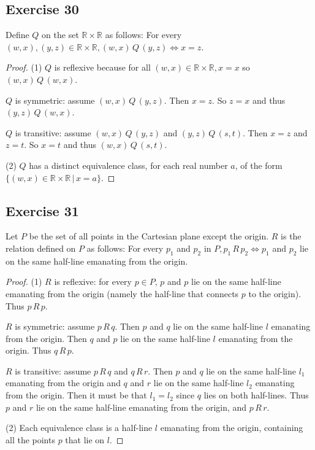 \documentclass[14pt]{extarticle}
\newcommand{\R}{\mathbb{R}}
\begin{document}
\subsection{Exercise 30}
Define $Q$ on the set \(\R \times \R\) as follows: For every \((w, x), (y, z) \in \R \times \R, (w, x) \,Q \, 
(y, z) \iff x = z\).

\begin{proof}
(1) $Q$ is reflexive because for all \((w, x) \in \R \times \R, x = x\) so \((w, x) \,Q\, (w, x)\).

$Q$ is symmetric: assume \((w, x) \,Q\, (y,z)\). Then \(x = z\). So \(z = x\) and thus \((y,z) \,Q\, (w, x)\).

$Q$ is transitive: assume \((w, x) \,Q\, (y,z)\) and \((y,z) \,Q\, (s,t)\). Then \(x = z\) and \(z = t\). So 
\(x = t\) and thus \((w,x) \,Q\, (s,t)\).

(2) $Q$ has a distinct equivalence class, for each real number $a$, of the form \(\{(w,x) \in \R \times \R \,|\,
x = a\}\).
\end{proof}

\subsection{Exercise 31}
Let $P$ be the set of all points in the Cartesian plane except the origin. $R$ is the relation defined on $P$ as 
follows: For every \(p_1\) and \(p_2\) in \(P, p_1 \,R\, p_2 \iff p_1\) and \(p_2\) lie on the same half-line 
emanating from the origin.

\begin{proof}
(1) $R$ is reflexive: for every \(p \in P\), $p$ and $p$ lie on the same half-line emanating from the origin (namely
the half-line that connects $p$ to the origin). Thus \(p \,R\, p\).

$R$ is symmetric: assume \(p\,R\,q\). Then $p$ and $q$ lie on the same half-line $l$ emanating from the origin. Then 
$q$ and $p$ lie on the same half-line $l$ emanating from the origin. Thus \(q \,R\,p\).

$R$ is transitive: assume \(p \,R\,q\) and \(q \,R\,r\). Then $p$ and $q$ lie on the same half-line $l_1$ emanating 
from the origin and $q$ and $r$ lie on the same half-line $l_2$ emanating from the origin. Then it must be that 
\(l_1 = l_2\) since $q$ lies on both half-lines. Thus $p$ and $r$ lie on the same half-line emanating from the 
origin, and \(p\,R\,r\).

(2) Each equivalence class is a half-line $l$ emanating from the origin, containing all the points $p$ that lie on $l$.
\end{proof}
\end{document}
